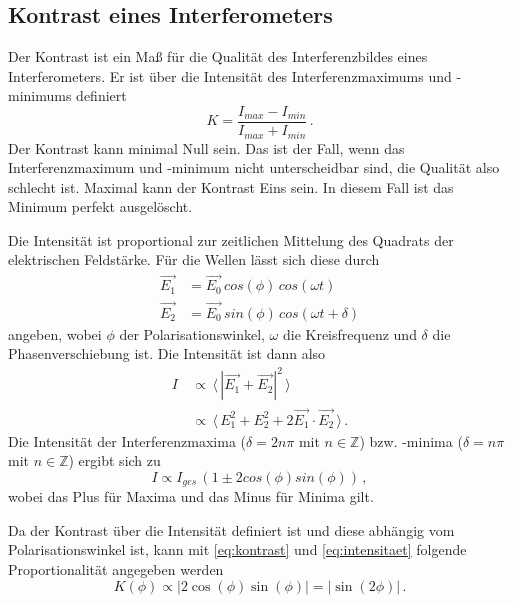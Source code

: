 \subsection{Kontrast eines Interferometers}
Der Kontrast ist ein Maß für die Qualität des Interferenzbildes eines Interferometers. Er ist über die Intensität des Interferenzmaximums und -minimums definiert
\begin{equation}
    K = \frac{I_{max}-I_{min}}{I_{max}+I_{min}} \, .
    \label{eq:kontrast}
\end{equation}
Der Kontrast kann minimal Null sein. Das ist der Fall, wenn das Interferenzmaximum und -minimum nicht unterscheidbar sind, die Qualität also schlecht ist.
Maximal kann der Kontrast Eins sein. In diesem Fall ist das Minimum perfekt ausgelöscht.

Die Intensität ist proportional zur zeitlichen Mittelung des Quadrats der elektrischen Feldstärke. Für die Wellen lässt sich diese durch
\begin{align*}
    \vec{E_1} &= \vec{E_0} \, cos(\phi) \, cos(\omega t) \\
    \vec{E_2} &= \vec{E_0} \, sin(\phi) \, cos(\omega t + \delta)
\end{align*}
angeben, wobei $\phi$ der Polarisationswinkel, $\omega$ die Kreisfrequenz und $\delta$ die Phasenverschiebung ist.
Die Intensität ist dann also
\begin{align*}
    I \, &\propto \, \langle \, |\vec{E_1}+\vec{E_2}|^2 \, \rangle \\
      &\propto \, \langle \, E^2_1 + E^2_2 + 2 \vec{E_1} \cdot \vec{E_2} \, \rangle \, .
\end{align*}
Die Intensität der Interferenzmaxima ($\delta = 2n\pi$ mit $n \in \mathbb{Z}$) bzw. -minima ($\delta = n\pi$ mit $n \in \mathbb{Z}$) ergibt sich zu 
\begin{equation}
    I \propto I_{ges} \, (1 \pm 2 cos(\phi) sin(\phi)) \, ,
    \label{eq:intensitaet}
\end{equation}
wobei das Plus für Maxima und das Minus für Minima gilt.

Da der Kontrast über die Intensität definiert ist und diese abhängig vom Polarisationswinkel ist, kann mit \autoref{eq:kontrast} und \autoref{eq:intensitaet} folgende Proportionalität angegeben werden
\begin{equation*}
    K(\phi) \propto | 2 \cos{(\phi)} \sin{(\phi)} | = |\sin{(2\phi)}| \, .
\end{equation*}


